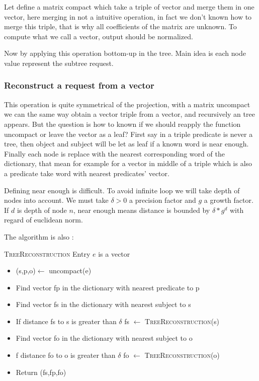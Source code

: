 Let define a matrix compact which take a triple of vector and merge them in one vector, here merging in not a intuitive operation, in fact we don't known how to merge this triple, that is why all coefficients of the matrix are unknown. To compute what we call a vector, output should be normalized.

Now by applying this operation bottom-up in the tree. Main idea is each node value represent the subtree request.


\subsubsection{Reconstruct a request from a vector}

This operation is quite symmetrical of the projection, with a matrix uncompact we can the same way obtain a vector triple from a vector, and recursively an tree appears. But the question is how to known if we should reapply the function uncompact or leave the vector as a leaf? First say in a triple predicate is never a tree, then object and subject will be let as leaf if a known word is near enough. Finally each node is replace with the nearest corresponding word of the dictionary, that mean for example for a vector in middle of a triple which is also a predicate take word with nearest predicates' vector.

Defining near enough is difficult. To avoid infinite loop we will take depth of nodes into account. We must take $\delta>0$ a precision factor and $g$ a growth factor. If $d$ is depth of node $n$, near enough means distance is bounded by $\delta*g^d$ with regard of euclidean norm.  

The algorithm is also :

\textsc{TreeReconstruction}
Entry $e$ is a vector

\begin{itemize}
\item (s,p,o)$\leftarrow$ uncompact(e)
\item Find vector fp in the dictionary with nearest predicate to p
\item Find vector fs in the dictionary with nearest subject to s
\item If distance fs to s is greater than $\delta$ fs $\leftarrow$ \textsc{TreeReconstruction}(s)
\item Find vector fo in the dictionary with nearest subject to o
\item f distance fo to o is greater than $\delta$ fo $\leftarrow$ \textsc{TreeReconstruction}(o)
\item Return (fs,fp,fo)
\end{itemize}

